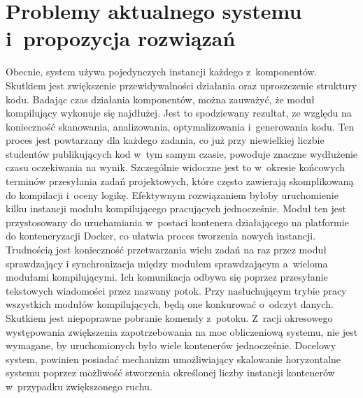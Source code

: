 \section{Problemy aktualnego systemu i~propozycja rozwiązań}
\indent Obecnie, system używa pojedynczych instancji każdego z~komponentów. Skutkiem jest zwiększenie przewidywalności działania oraz uproszczenie struktury kodu. Badając czas działania komponentów, można zauważyć, że moduł kompilujący wykonuje się najdłużej. Jest to spodziewany rezultat, ze względu na konieczność skanowania, analizowania, optymalizowania i~generowania kodu\cite{procesKompilacji}. Ten proces jest powtarzany dla każdego zadania, co już przy niewielkiej liczbie studentów publikujących kod w~tym samym czasie, powoduje znaczne wydłużenie czasu oczekiwania na wynik. Szczególnie widoczne jest to w~okresie końcowych terminów przesyłania zadań projektowych, które często zawierają skomplikowaną do kompilacji i~oceny logikę. Efektywnym rozwiązaniem byłoby uruchomienie kilku instancji modułu kompilującego pracujących jednocześnie. Moduł ten jest przystosowany do uruchamiania w~postaci kontenera działającego na platformie do konteneryzacji Docker, co ułatwia proces tworzenia nowych instancji. Trudnością jest konieczność przetwarzania wielu zadań na raz przez moduł sprawdzający i synchronizacja między modułem sprawdzającym a~wieloma modułami kompilującymi. Ich komunikacja odbywa się poprzez przesyłanie tekstowych wiadomości przez nazwany potok. Przy nasłuchującym trybie pracy wszystkich modułów kompilujących, będą one konkurować o~odczyt danych. Skutkiem jest niepoprawne pobranie komendy z~potoku. Z~racji okresowego występowania zwiększenia zapotrzebowania na moc obliczeniową systemu, nie jest wymagane, by uruchomionych było wiele kontenerów jednocześnie. Docelowy system, powinien posiadać mechanizm umożliwiający skalowanie horyzontalne systemu poprzez możliwość stworzenia określonej liczby instancji kontenerów w~przypadku zwiększonego ruchu.
